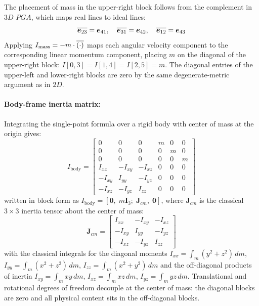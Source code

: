 The placement of mass in the upper-right block follows from the complement in $3D$ $PGA$,
which maps real lines to ideal lines:
\begin{equation}
    \overline{\bm{e}_{23}} = \bm{e}_{41}, \quad \overline{\bm{e}_{31}} = \bm{e}_{42}, \quad
    \overline{\bm{e}_{12}} = \bm{e}_{43}
    \label{eq:dual_pga3dp}
\end{equation}
Applying $I_\mathrm{mass} = -m \cdot \overline{(\cdot)}$ maps each angular velocity component
to the corresponding linear momentum component, placing $m$ on the diagonal of the
upper-right block: $I[0,3] = I[1,4] = I[2,5] = m$. The diagonal entries of the upper-left
and lower-right blocks are zero by the same degenerate-metric argument as in $2D$.

\paragraph{Body-frame inertia matrix:} Integrating the single-point formula over a rigid
body
with center of mass at the origin gives:
\begin{equation}
    I_\mathrm{body} =
    \begin{bmatrix}
        0       & 0       & 0       &  m   & 0    & 0    \\
        0       & 0       & 0       &  0   & m    & 0    \\
        0       & 0       & 0       &  0   & 0    & m    \\
        I_{xx}  & -I_{xy} & -I_{xz} &  0   & 0    & 0    \\
        -I_{xy} &  I_{yy} & -I_{yz} &  0   & 0    & 0    \\
        -I_{xz} & -I_{yz} &  I_{zz} &  0   & 0    & 0
    \end{bmatrix}
    \label{eq:inertia_3D_body}
\end{equation}
written in block form as $I_\mathrm{body} = [\mathbf{0},\; m\mathbf{I}_3;\;
\mathbf{J}_{cm},\; \mathbf{0}]$, where $\mathbf{J}_{cm}$ is the classical $3\times3$
inertia tensor about the center of mass:
\begin{equation}
    \mathbf{J}_{cm} =
    \begin{bmatrix}
        I_{xx}  & -I_{xy} & -I_{xz} \\
        -I_{xy} &  I_{yy} & -I_{yz} \\
        -I_{xz} & -I_{yz} &  I_{zz}
    \end{bmatrix}
    \label{eq:classical_inertia_tensor}
\end{equation}
with the classical integrals for the diagonal moments $I_{xx} = \int_m (y^2+z^2)\,dm$,
$I_{yy} = \int_m (x^2+z^2)\,dm$, $I_{zz} = \int_m (x^2+y^2)\,dm$ and the off-diagonal
products of inertia $I_{xy} = \int_m xy\,dm$, $I_{xz} = \int_m xz\,dm$, $I_{yz} = \int_m
yz\,dm$. Translational and rotational degrees of freedom decouple at the center of mass:
the diagonal blocks are zero and all physical content sits in the off-diagonal blocks.

